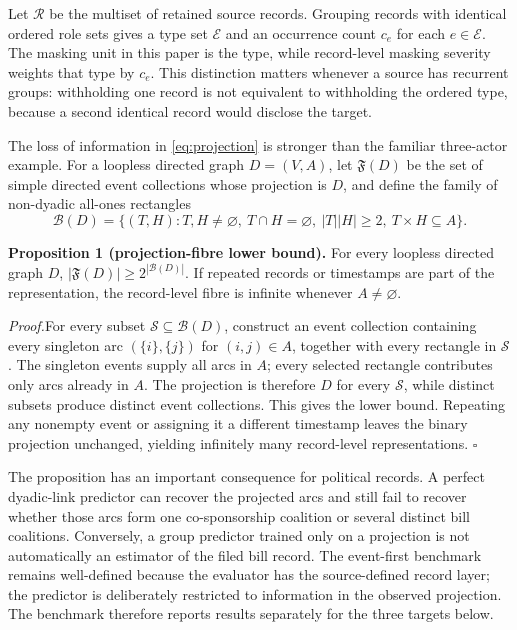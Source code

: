 \documentclass{nws}
\newcommand{\plainproposition}[1]{\par\medskip\noindent\textbf{#1.}\enspace}
\newcommand{\plainproof}{\par\noindent\textit{Proof.}\enspace}
\begin{document}
Let $\mathcal{R}$ be the multiset of retained source records. Grouping records with identical ordered role sets gives a type set $\mathcal{E}$ and an occurrence count $c_e$ for each $e\in\mathcal{E}$. The masking unit in this paper is the type, while record-level masking severity weights that type by $c_e$. This distinction matters whenever a source has recurrent groups: withholding one record is not equivalent to withholding the ordered type, because a second identical record would disclose the target.

The loss of information in \eqref{eq:projection} is stronger than the familiar three-actor example. For a loopless directed graph $D=(V,A)$, let $\mathfrak{F}(D)$ be the set of simple directed event collections whose projection is $D$, and define the family of non-dyadic all-ones rectangles
\begin{equation}
 \mathcal{B}(D)=\{(T,H):T,H\ne\varnothing,\ T\cap H=\varnothing,\ |T||H|\geq2,\ T\times H\subseteq A\}.
 \label{eq:projection-fibre}
\end{equation}

\plainproposition{Proposition 1 (projection-fibre lower bound)} For every loopless directed graph $D$, $|\mathfrak{F}(D)|\geq2^{|\mathcal{B}(D)|}$. If repeated records or timestamps are part of the representation, the record-level fibre is infinite whenever $A\neq\varnothing$.

\plainproof For every subset $\mathcal{S}\subseteq\mathcal{B}(D)$, construct an event collection containing every singleton arc $(\{i\},\{j\})$ for $(i,j)\in A$, together with every rectangle in $\mathcal{S}$. The singleton events supply all arcs in $A$; every selected rectangle contributes only arcs already in $A$. The projection is therefore $D$ for every $\mathcal{S}$, while distinct subsets produce distinct event collections. This gives the lower bound. Repeating any nonempty event or assigning it a different timestamp leaves the binary projection unchanged, yielding infinitely many record-level representations. \hfill $\square$

The proposition has an important consequence for political records. A perfect dyadic-link predictor can recover the projected arcs and still fail to recover whether those arcs form one co-sponsorship coalition or several distinct bill coalitions. Conversely, a group predictor trained only on a projection is not automatically an estimator of the filed bill record. The event-first benchmark remains well-defined because the evaluator has the source-defined record layer; the predictor is deliberately restricted to information in the observed projection. The benchmark therefore reports results separately for the three targets below.
\end{document}
